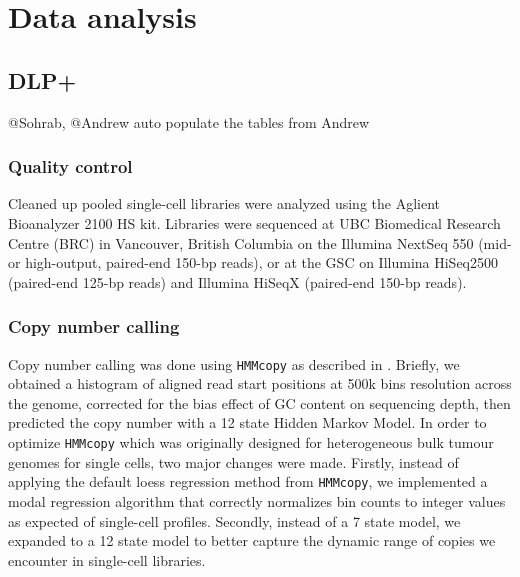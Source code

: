 \documentclass{article}
\begin{document}
\begin{comment}
For breakpoint prediction we used deStruct \citep{McPherson117523}, which produced per cell per breakpoint counts.
Breakpoints were filtered for predictions with at least 5 split reads, and at least 250 nucleotides anchoring the predicted sequence on either side of the breakpoint ($\operatorname{template\_length\_min}$ feature).
\end{comment}



\section{Data analysis}
\subsection{DLP+}
@Sohrab, @Andrew 
auto populate the tables from Andrew

\subsubsection{Quality control}

Cleaned up pooled single-cell libraries were analyzed using the Aglient Bioanalyzer 2100 HS kit. Libraries were sequenced at UBC Biomedical Research Centre (BRC) in Vancouver, British Columbia on the Illumina NextSeq 550 (mid- or high-output, paired-end 150-bp reads), or at the GSC on Illumina HiSeq2500 (paired-end 125-bp reads) and Illumina HiSeqX (paired-end 150-bp reads).



\subsubsection{Copy number calling}
Copy number calling was done using \texttt{HMMcopy} as described in \citet{Ha2012}. 
Briefly, we obtained a histogram of aligned read start positions at 500k bins resolution across the genome, corrected for the bias effect of GC content on sequencing depth, then predicted the copy number with a 12 state Hidden Markov Model. In order to optimize \texttt{HMMcopy} which was originally designed for heterogeneous bulk tumour genomes for single cells, two major changes were made. Firstly, instead of applying the default loess regression method from \texttt{HMMcopy}, we implemented a modal regression algorithm that correctly normalizes bin counts to integer values as expected of single-cell profiles. Secondly, instead of a 7 state model, we expanded to a 12 state model to better capture the dynamic range of copies we encounter in single-cell libraries.
\end{document}
